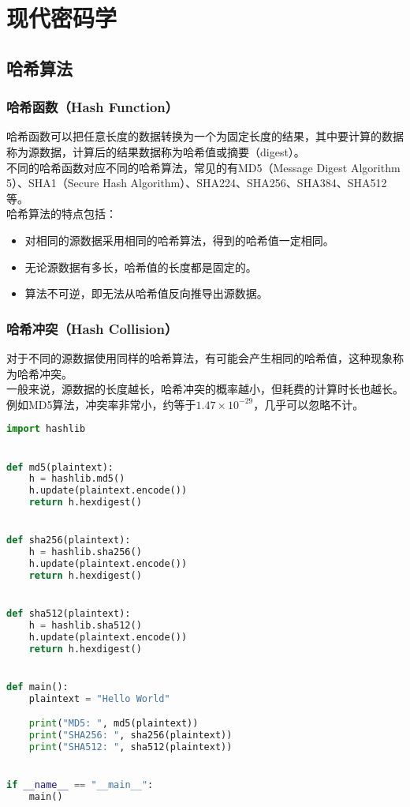 \chapter{现代密码学}

\section{哈希算法}

\subsection{哈希函数（Hash Function）}

哈希函数可以把任意长度的数据转换为一个为固定长度的结果，其中要计算的数据称为源数据，计算后的结果数据称为哈希值或摘要（digest）。\\

不同的哈希函数对应不同的哈希算法，常见的有MD5（Message Digest Algorithm 5）、SHA1（Secure Hash Algorithm）、SHA224、SHA256、SHA384、SHA512等。\\

哈希算法的特点包括：

\begin{itemize}
    \item 对相同的源数据采用相同的哈希算法，得到的哈希值一定相同。
    \item 无论源数据有多长，哈希值的长度都是固定的。
    \item 算法不可逆，即无法从哈希值反向推导出源数据。
\end{itemize}

\vspace{0.5cm}

\subsection{哈希冲突（Hash Collision）}

对于不同的源数据使用同样的哈希算法，有可能会产生相同的哈希值，这种现象称为哈希冲突。\\

一般来说，源数据的长度越长，哈希冲突的概率越小，但耗费的计算时长也越长。例如MD5算法，冲突率非常小，约等于$ 1.47 \times 10^{-29} $，几乎可以忽略不计。\\


\begin{lstlisting}[language=Python]
import hashlib


def md5(plaintext):
    h = hashlib.md5()
    h.update(plaintext.encode())
    return h.hexdigest()


def sha256(plaintext):
    h = hashlib.sha256()
    h.update(plaintext.encode())
    return h.hexdigest()


def sha512(plaintext):
    h = hashlib.sha512()
    h.update(plaintext.encode())
    return h.hexdigest()


def main():
    plaintext = "Hello World"

    print("MD5: ", md5(plaintext))
    print("SHA256: ", sha256(plaintext))
    print("SHA512: ", sha512(plaintext))


if __name__ == "__main__":
    main()
\end{lstlisting}

